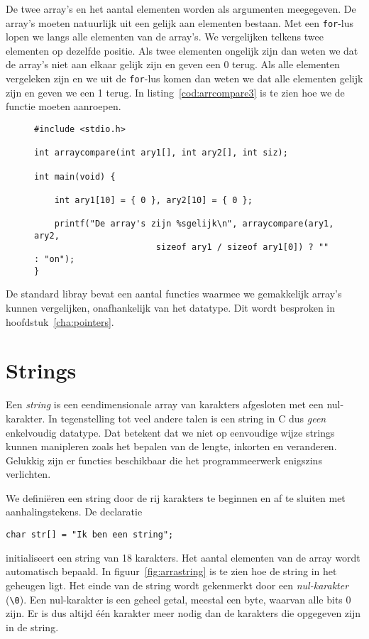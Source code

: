 De twee array's en het aantal elementen worden als argumenten meegegeven. De array's moeten natuurlijk uit een gelijk aan elementen bestaan. Met een \texttt{for}-lus lopen we langs alle elementen van de array's. We vergelijken telkens twee elementen op dezelfde positie. Als twee elementen ongelijk zijn dan weten we dat de array's niet aan elkaar gelijk zijn en geven een 0 terug. Als alle elementen vergeleken zijn en we uit de \texttt{for}-lus komen dan weten we dat alle elementen gelijk zijn en geven we een 1 terug. In listing~\ref{cod:arrcompare3} is te zien hoe we de functie moeten aanroepen.

\begin{figure}[!ht]
\begin{lstlisting}[caption=Vergelijken van twee array's.,label=cod:arrcompare3]
#include <stdio.h>

int arraycompare(int ary1[], int ary2[], int siz);
	
int main(void) {

	int ary1[10] = { 0 }, ary2[10] = { 0 };

	printf("De array's zijn %sgelijk\n", arraycompare(ary1, ary2,
                        sizeof ary1 / sizeof ary1[0]) ? "" : "on");
}
\end{lstlisting}
\end{figure}

De standard libray bevat een aantal functies waarmee we gemakkelijk array's kunnen vergelijken, onafhankelijk van het datatype. Dit wordt besproken in hoofdstuk~\ref{cha:pointers}.

\section{Strings}
Een \textsl{string} is een eendimensionale array van karakters afgesloten met een nul-karakter. In tegenstelling tot veel andere talen is een string in C dus \textsl{geen} enkelvoudig datatype. Dat betekent dat we niet op eenvoudige wijze strings kunnen manipleren zoals het bepalen van de lengte, inkorten en veranderen. Gelukkig zijn er functies beschikbaar die het programmeerwerk enigszins verlichten. 

We definiëren een string door de rij karakters te beginnen en af te sluiten met aanhalingstekens. De declaratie

\hspace*{1em}\texttt{char str[] = "Ik ben een string";}

initialiseert een string van 18 karakters. Het aantal elementen van de array wordt automatisch bepaald.
In figuur~\ref{fig:arrastring} is te zien hoe de string in het geheugen ligt. Het einde van de string wordt gekenmerkt door een \textsl{nul-karakter} (\texttt{\textbackslash 0}). Een nul-karakter is een geheel getal, meestal een byte, waarvan alle bits 0 zijn. Er is dus altijd één karakter meer nodig dan de karakters die opgegeven zijn in de string.

